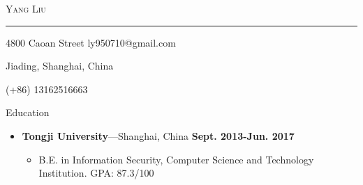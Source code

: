 \documentclass[10pt,oneside]{article}
\newcommand{\bigname}[1]{
	\begin{center}\fontfamily{phv}\selectfont\Huge\scshape#1\end{center}
}
\newenvironment{ressection}[1]{
	\vspace{4pt}
	{\fontfamily{phv}\selectfont\Large#1}
	\begin{itemize}
	\vspace{3pt}
}{
	\end{itemize}
}
\newcommand{\ressubitem}[1]{
	\vspace{-1pt}
	\item \begin{flushleft} #1 \end{flushleft}
}
\newcommand{\resbigitem}[3]{
	\vspace{-5pt}
	\item
	\textbf{#1}---#2 \
	\textit{#3}
}
\newenvironment{ressubsec}[3]{
	\resbigitem{#1}{#2}{#3}
	\vspace{-2pt}
	\begin{itemize}
}{
	\end{itemize}
}
\begin{document}
 \selectfont

\bigname{Yang Liu}

\vspace{-8pt} \rule{\textwidth}{1pt}

\vspace{-1pt} {4800 Caoan Street \hfill ly950710@gmail.com}

\vspace{-1pt} {Jiading, Shanghai, China}

\vspace{-1pt} {(+86) 13162516663}

\vspace{8 pt}

\newcommand{\textsharp}{$\sharp$}

\begin{ressection}{Education}
	\begin{ressubsec}{Tongji University}{Shanghai, China \hfill \textbf{Sept. 2013-Jun. 2017}}{}
		\ressubitem{B.E. in Information Security, Computer Science and Technology Institution. GPA: 87.3/100}
	\end{ressubsec}
\end{ressection}
	
\end{document}

